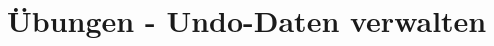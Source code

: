 \section{\"Ubungen - Undo-Daten verwalten}
  \begin{enumerate}
    

    
    \begin{enumerate}
      

      

      

      

      

      
    \end{enumerate}
    
  \end{enumerate}
\clearpage